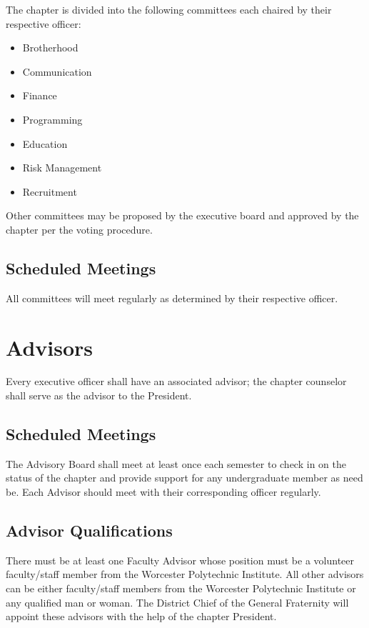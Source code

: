 The chapter is divided into the following committees each chaired by their
respective officer: 

\begin{itemize}
	\item Brotherhood
	\item Communication
	\item Finance
	\item Programming
	\item Education
	\item Risk Management
	\item Recruitment
\end{itemize}

Other committees may be proposed by the executive board and approved by the
chapter per the voting procedure.

\subsection{Scheduled Meetings}
\label{sec:committee-scheduled-meetings}

All committees will meet regularly as determined by their respective officer.

\section{Advisors}
\label{sec:advisors}

Every executive officer shall have an associated advisor; the chapter counselor
shall serve as the advisor to the President.

\subsection{Scheduled Meetings}
\label{sec:advisory-board-scheduled-meetings}

The Advisory Board shall meet at least once each semester to check in on the
status of the chapter and provide support for any undergraduate member as need
be.
Each Advisor should meet with their corresponding officer regularly.

\subsection{Advisor Qualifications}
\label{sec:advisor-qualifications}

There must be at least one Faculty Advisor whose position must be a volunteer
faculty/staff member from the Worcester Polytechnic Institute.
All other advisors can be either faculty/staff members from the Worcester
Polytechnic Institute or any qualified man or woman.
The District Chief of the General Fraternity will appoint these advisors with
the help of the chapter President.

